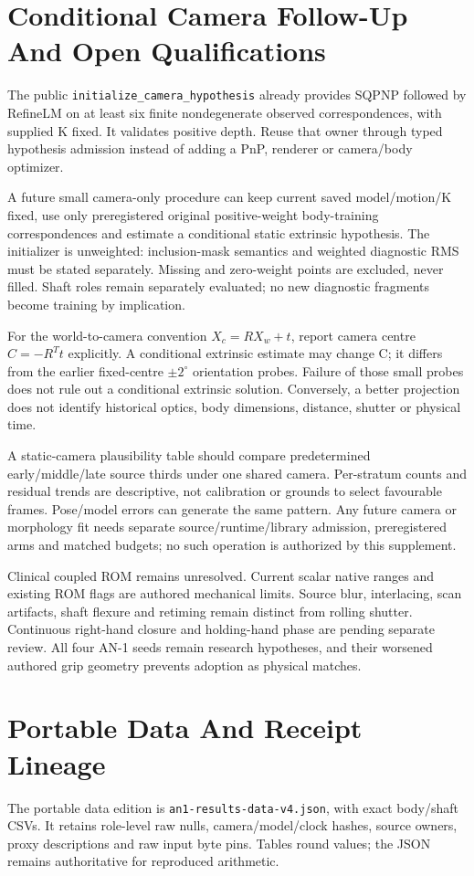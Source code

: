 \documentclass[11pt,letterpaper]{article}
\newcommand{\code}[1]{\nolinkurl{#1}}\newcommand{\hash}[1]{{\footnotesize\nolinkurl{#1}}}
\newcommand{\chapterpage}[1]{\clearpage\section{#1}}
\begin{document}
\chapterpage{Conditional Camera Follow-Up And Open Qualifications}
The public \code{initialize_camera_hypothesis} already provides SQPNP followed by RefineLM on at least six finite nondegenerate observed correspondences, with supplied K fixed. It validates positive depth. Reuse that owner through typed hypothesis admission instead of adding a PnP, renderer or camera/body optimizer.

A future small camera-only procedure can keep current saved model/motion/K fixed, use only preregistered original positive-weight body-training correspondences and estimate a conditional static extrinsic hypothesis. The initializer is unweighted: inclusion-mask semantics and weighted diagnostic RMS must be stated separately. Missing and zero-weight points are excluded, never filled. Shaft roles remain separately evaluated; no new diagnostic fragments become training by implication.

For the world-to-camera convention $X_c=RX_w+t$, report camera centre $C=-R^Tt$ explicitly. A conditional extrinsic estimate may change C; it differs from the earlier fixed-centre $\pm2^\circ$ orientation probes. Failure of those small probes does not rule out a conditional extrinsic solution. Conversely, a better projection does not identify historical optics, body dimensions, distance, shutter or physical time.

A static-camera plausibility table should compare predetermined early/middle/late source thirds under one shared camera. Per-stratum counts and residual trends are descriptive, not calibration or grounds to select favourable frames. Pose/model errors can generate the same pattern. Any future camera or morphology fit needs separate source/runtime/library admission, preregistered arms and matched budgets; no such operation is authorized by this supplement.

Clinical coupled ROM remains unresolved. Current scalar native ranges and existing ROM flags are authored mechanical limits. Source blur, interlacing, scan artifacts, shaft flexure and retiming remain distinct from rolling shutter. Continuous right-hand closure and holding-hand phase are pending separate review. All four AN-1 seeds remain research hypotheses, and their worsened authored grip geometry prevents adoption as physical matches.

\chapterpage{Portable Data And Receipt Lineage}
The portable data edition is \code{an1-results-data-v4.json}, with exact body/shaft CSVs. It retains role-level raw nulls, camera/model/clock hashes, source owners, proxy descriptions and raw input byte pins. Tables round values; the JSON remains authoritative for reproduced arithmetic.
\end{document}
